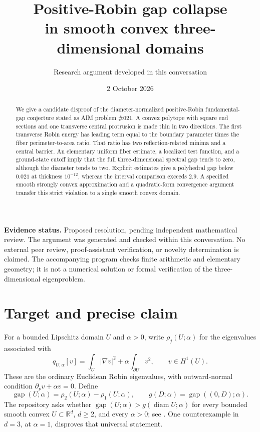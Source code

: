 \documentclass[11pt,a4paper]{article}
\title{Positive-Robin gap collapse\\in smooth convex three-dimensional domains}
\author{Research argument developed in this conversation}
\date{2 October 2026}
\theoremstyle{remark}
\newcommand{\R}{\mathbb R}
\newcommand{\gap}{\operatorname{gap}}
\newcommand{\diam}{\operatorname{diam}}
\begin{document}
\maketitle
\thispagestyle{empty}

\begin{abstract}
We give a candidate disproof of the diameter-normalized positive-Robin fundamental-gap conjecture stated as AIM problem \#021. A convex polytope with square end sections and one transverse central protrusion is made thin in two directions. The first transverse Robin energy has leading term equal to the boundary parameter times the fiber perimeter-to-area ratio. That ratio has two reflection-related minima and a central barrier. An elementary uniform fiber estimate, a localized test function, and a ground-state cutoff imply that the full three-dimensional spectral gap tends to zero, although the diameter tends to two. Explicit estimates give a polyhedral gap below $0.021$ at thickness $10^{-12}$, whereas the interval comparison exceeds $2.9$. A specified smooth strongly convex approximation and a quadratic-form convergence argument transfer this strict violation to a single smooth convex domain.
\end{abstract}

\medskip
\textbf{Evidence status.} Proposed resolution, pending independent mathematical review. The argument was generated and checked within this conversation. No external peer review, proof-assistant verification, or novelty determination is claimed. The accompanying program checks finite arithmetic and elementary geometry; it is not a numerical solution or formal verification of the three-dimensional eigenproblem.

\section{Target and precise claim}
For a bounded Lipschitz domain $U$ and $\alpha>0$, write $\rho_j(U;\alpha)$ for the eigenvalues associated with
\[
 q_{U,\alpha}[v]=\int_U |\nabla v|^2+\alpha\int_{\partial U}v^2,
 \qquad v\in H^1(U).
\]
These are the ordinary Euclidean Robin eigenvalues, with outward-normal condition $\partial_\nu v+\alpha v=0$. Define
\[
 \gap(U;\alpha)=\rho_2(U;\alpha)-\rho_1(U;\alpha),\qquad
 g(D;\alpha)=\gap((0,D);\alpha).
\]
The repository asks whether $\gap(U;\alpha)>g(\diam U;\alpha)$ for every bounded smooth convex $U\subset\R^d$, $d\ge2$, and every $\alpha>0$; see \cite{aim,laugesen}. One counterexample in $d=3$, at $\alpha=1$, disproves that universal statement.
\end{document}
